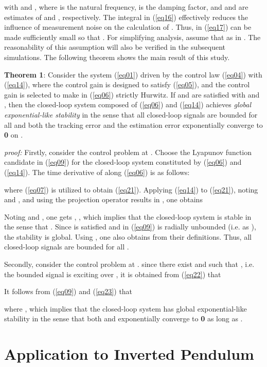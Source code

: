 \documentclass[conference]{IEEEtran}
\begin{document}
with  and , where  is the natural frequency,  is the damping factor, and  and  are estimates of  and , respectively. The integral in (\ref{eq16}) effectively reduces the influence of measurement noise on the calculation of . Thus,  in (\ref{eq17}) can be made sufficiently small so that . For simplifying analysis, assume that  as in \cite{Hu2013}. The reasonability of this assumption will also be verified in the subsequent simulations. The following theorem shows the main result of this study.

\textbf{Theorem 1}: Consider the system (\ref{eq01}) driven by the control law (\ref{eq04}) with (\ref{eq14}), where the control gain  is designed to satisfy (\ref{eq05}), and the control gain  is selected to make  in (\ref{eq06}) strictly Hurwitz. If  and  are satisfied with  and   , then the closed-loop system composed of (\ref{eq06}) and (\ref{eq14}) achieves \emph{global exponential-like stability} in the sense that all closed-loop signals are bounded for all  and both the tracking error  and the estimation error  exponentially converge to \textbf{0} on .

\emph{proof:} Firstly, consider the control problem at . Choose the Lyapunov function candidate  in (\ref{eq09}) for the closed-loop system constituted by (\ref{eq06}) and (\ref{eq14}). The time de\-rivative of  along (\ref{eq06}) is as follows:

where (\ref{eq07}) is utilized to obtain (\ref{eq21}). Applying (\ref{eq14}) to (\ref{eq21}), noting  and , and using the pro\-jection operator results in \cite{Ioannou1996}, one obtains

Noting  and , one gets , , which implies that the closed-loop system is stable in the sense that . Since   is satisfied  and  in (\ref{eq09}) is radially unbounded (i.e.  as ), the stability is global. Using , one also obtains  from their definitions. Thus, all closed-loop signals are bounded for all .

Secondly, consider the control problem at . since there exist  and  such that , i.e. the bounded signal  is exciting over , it is obtained from (\ref{eq22}) that

It follows from (\ref{eq09}) and (\ref{eq23}) that

where , which implies that the closed-loop system has global exponential-like stability in the sense that both  and  exponentially converge to \textbf{0} as long as . \hfill 

\section{Application to Inverted Pendulum} \label{Example}
\end{document}
